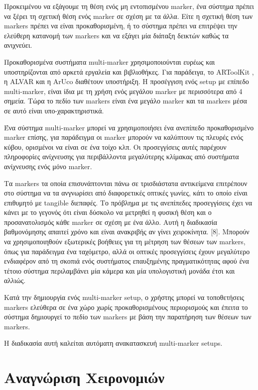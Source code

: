 Προκειμένου να εξάγουμε τη θέση ενός μη εντοπισμένου marker, ένα σύστημα πρέπει να ξέρει τη σχετική θέση ενός marker σε σχέση με τα άλλα. Είτε η σχετική θέση των markers πρέπει να είναι προκαθορισμένη, ή το σύστημα πρέπει να επιτρέψει την ελεύθερη κατανομή των markers και να εξάγει μία διάταξη δεικτών καθώς τα ανιχνεύει. 

Προκαθορισμένα συστήματα multi-marker χρησιμοποιούνται ευρέως και υποστηρίζονται από αρκετά εργαλεία και βιβλιοθήκες. Για παράδειγα, το ARToolKit \cite{artoolkit}, η ALVAR \cite{alvar} και η ArUco\cite{aruco} διαθέτουν υποστήριξη. Η προσέγγιση ενός setup με επίπεδο multi-marker, είναι ίδια με τη χρήση ενός μεγάλου marker με περισσότερα από 4 σημεία. Τώρα το πεδίο των markers είναι ένα μεγάλο marker και τα markers μέσα σε αυτό είναι υπο-χαρακτηριστικά. 

Ένα σύστημα multi-marker μπορεί να χρησιμοποιήσει ένα ανεπίπεδο προκαθορισμένο marker επίσης, για παράδειγμα οι marker μπορούν να καλύπτουν τις πλευρές ενός κύβου, ορισμένοι να είναι σε ένα τοίχο κλπ.\cite{uematsu2005ar}
Οι προσεγγίσεις αυτές παρέχουν πληροφορίες ανίχνευσης για περιβάλλοντα μεγαλύτερης κλίμακας από συστήματα ανίχνευσης ενός μόνο marker. 

Τα markers τα οποία επισυνάπτονται πάνω σε τρισδιάστατα αντικείμενα επιτρέπουν στο σύστημα να τα ανγνωρίσει από διαφορετικές οπτικές γωνίες, κάτι το οποίο είναι επιθυμητό με tangible διεπαφές.
Το πρόβλημα με τις ανεπίπεδες προσεγγίσεις έχει να κάνει με το γεγονός ότι είναι δύσκολο να μετρηθεί η φυσική θέση και ο προσανατολισμός κάθε marker σε σχέση με ένα άλλο.
Αυτή η διαδικασία βαθμονόμησης απαιτεί χρόνο και είναι ανακριβής αν γίνει χειροκίνητα. [8]. Μπορούν να χρησιμοποιηθούν εξωτερικές βοήθειες για τη μέτρηση των θέσεων των markers, όπως για παράδειγμα ένα ταχόμετρο, αλλά οι οπτικές προσεγγίσεις έχουν μεγαλύτερο ενδιαφέρον από τη σκοπιά ενός συστήματος επαυξημένης πραγματικότητας αφού ένα τέτοιο σύστημα περιλαμβάνει μία κάμερα και μία υπολογιστική μονάδα έτσι και αλλιώς.

Κατά την δημιουργία ενός multi-marker setup, ο χρήστης μπορεί να τοποθετήσεις markers ελεύθερα σε ένα χώρο χωρίς προκαθορισμένους περιορισμούς και έπειτα το σύστημα δημιουργεί το πεδίο των markers με βάση την παρατήρηση των θέσεων των markers.

Η διαδικασία αυτή καλείται αυτόματη ανακατασκευή multi-marker setups.




\section{Αναγνώριση Χειρονομιών}


